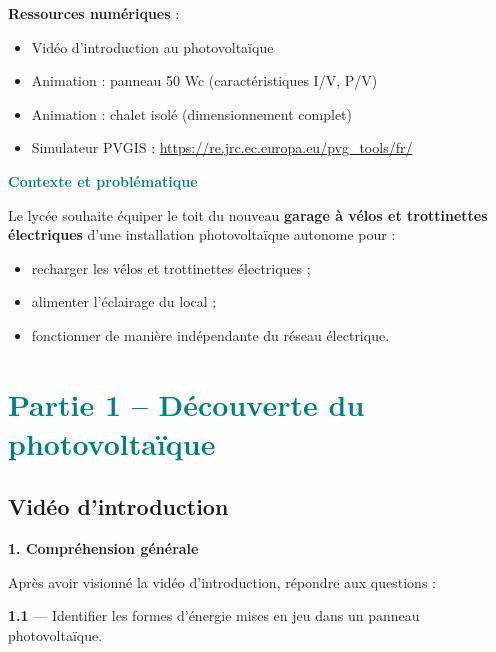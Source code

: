 \documentclass[a4paper, 11pt, oneside]{article}
\newcommand{\question}[1]{\textcolor{bleucol}{\textbf{#1}}}
\begin{document}
\textbf{Ressources numériques} :
\begin{itemize}
  \item Vidéo d'introduction au photovoltaïque
  \item Animation : panneau 50 Wc (caractéristiques I/V, P/V)
  \item Animation : chalet isolé (dimensionnement complet)
  \item Simulateur PVGIS : \url{https://re.jrc.ec.europa.eu/pvg_tools/fr/}
\end{itemize}

\vspace{0.6cm}

\textcolor{teal}{\textbf{\large Contexte et problématique}}

\vspace{0.2cm}
Le lycée souhaite équiper le toit du nouveau \textbf{garage à vélos et trottinettes électriques} d'une installation photovoltaïque autonome pour :
\begin{itemize}
  \item recharger les vélos et trottinettes électriques ;
  \item alimenter l'éclairage du local ;
  \item fonctionner de manière indépendante du réseau électrique.
\end{itemize}

\newpage

\section{\textcolor{teal}{Partie 1 -- Découverte du photovoltaïque}}

\subsection*{Vidéo d'introduction}

\question{1. Compréhension générale}

\vspace{0.2cm}
Après avoir visionné la vidéo d'introduction, répondre aux questions :

\vspace{0.4cm}
\textbf{1.1} --- Identifier les formes d'énergie mises en jeu dans un panneau photovoltaïque.

\vspace{0.3cm}
\end{document}
